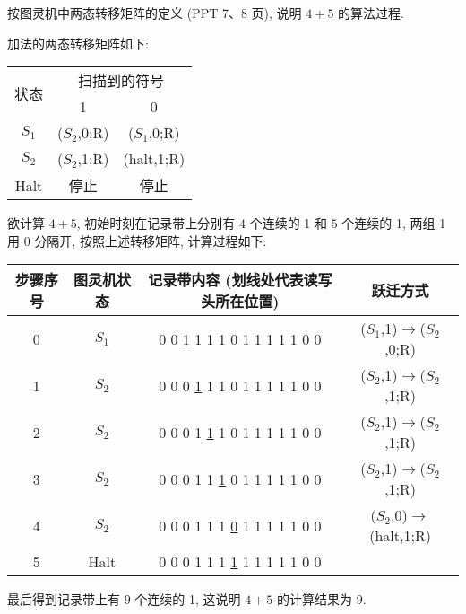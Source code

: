 \documentclass{assignment}
\begin{document}
\begin{prob}
    按图灵机中两态转移矩阵的定义 (PPT 7、8 页), 说明 $4+5$ 的算法过程.
\end{prob}
\begin{sol}
    加法的两态转移矩阵如下:
    \begin{table}[h]
        \centering
        \begin{tabular}{|c|cc|}
        \hline
        \multirow{2}{*}{状态} & \multicolumn{2}{c|}{扫描到的符号} \\ \cline{2-3} 
         & \multicolumn{1}{c|}{1} & 0 \\ \hline
        $S_1$ & \multicolumn{1}{c|}{($S_2$,0;R)} & ($S_1$,0;R) \\ \hline
        $S_2$ & \multicolumn{1}{c|}{($S_2$,1;R)} & (halt,1;R) \\ \hline
        Halt & \multicolumn{1}{c|}{停止} & 停止 \\ \hline
        \end{tabular}
    \end{table}

    欲计算 $4+5$, 初始时刻在记录带上分别有 $4$ 个连续的 1 和 $5$ 个连续的 1, 两组 1 用 0 分隔开, 按照上述转移矩阵, 计算过程如下:
    \begin{table}[h]
        \centering
        \begin{tabular}{|c|c|c|c|}
        \hline
        步骤序号 & 图灵机状态 & 记录带内容 (划线处代表读写头所在位置) & 跃迁方式 \\ \hline
        0 & $S_1$ & 0 0 \uline{1} 1 1 1 0 1 1 1 1 1 0 0 & ($S_1$,1)$\rightarrow$($S_2$,0;R) \\ \hline
        1 & $S_2$ & 0 0 0 \uline{1} 1 1 0 1 1 1 1 1 0 0 & ($S_2$,1)$\rightarrow$($S_2$,1;R) \\ \hline
        2 & $S_2$ & 0 0 0 1 \uline{1} 1 0 1 1 1 1 1 0 0 & ($S_2$,1)$\rightarrow$($S_2$,1;R) \\ \hline
        3 & $S_2$ & 0 0 0 1 1 \uline{1} 0 1 1 1 1 1 0 0 & ($S_2$,1)$\rightarrow$($S_2$,1;R) \\ \hline
        4 & $S_2$ & 0 0 0 1 1 1 \uline{0} 1 1 1 1 1 0 0 & ($S_2$,0)$\rightarrow$(halt,1;R) \\ \hline
        5 & Halt & 0 0 0 1 1 1 \uline{1} 1 1 1 1 1 0 0 &  \\ \hline
        \end{tabular}
    \end{table}

    最后得到记录带上有 $9$ 个连续的 1, 这说明 $4+5$ 的计算结果为 $9$.
\end{sol}
\end{document}
